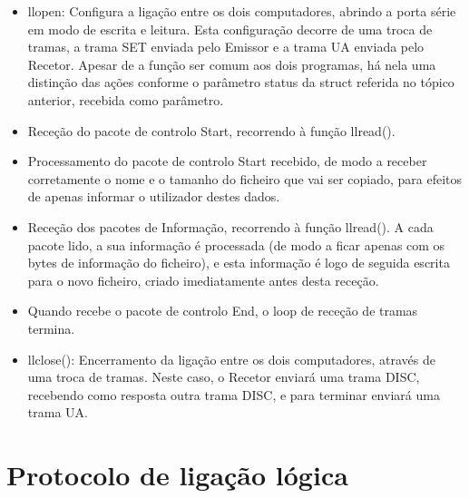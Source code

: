 \documentclass[article, a4paper, 11pt, oneside]{memoir}
\begin{document}
\begin{itemize}
 	\item llopen: Configura a ligação entre os dois computadores, abrindo a porta série em modo de escrita e leitura. Esta configuração decorre de uma troca de tramas, a trama SET enviada pelo Emissor e a trama UA enviada pelo Recetor. Apesar de a função ser comum aos dois programas, há nela uma distinção das ações conforme o parâmetro status da struct referida no tópico anterior, recebida como parâmetro.
 	\item Receção do pacote de controlo Start, recorrendo à função llread().
 	\item Processamento do pacote de controlo Start recebido, de modo a receber corretamente o nome e o tamanho do ficheiro que vai ser copiado, para efeitos de apenas informar o utilizador destes dados.
 	\item Receção dos pacotes de Informação, recorrendo à função llread(). A cada pacote lido, a sua informação é processada (de modo a ficar apenas com os bytes de informação do ficheiro), e esta informação é logo de seguida escrita para o novo ficheiro, criado imediatamente antes desta receção.
 	\item Quando recebe o pacote de controlo End, o loop de receção de tramas termina.
 	\item llclose(): Encerramento da ligação entre os dois computadores, através de uma troca de tramas. Neste caso, o Recetor enviará uma trama DISC, recebendo como resposta outra trama DISC, e para terminar enviará uma trama UA.
\end{itemize}

\chapter[Protocolo de ligação lógica][Protocolo de ligação lógica]{Protocolo de ligação lógica} \label{\thechapter}
\end{document}
